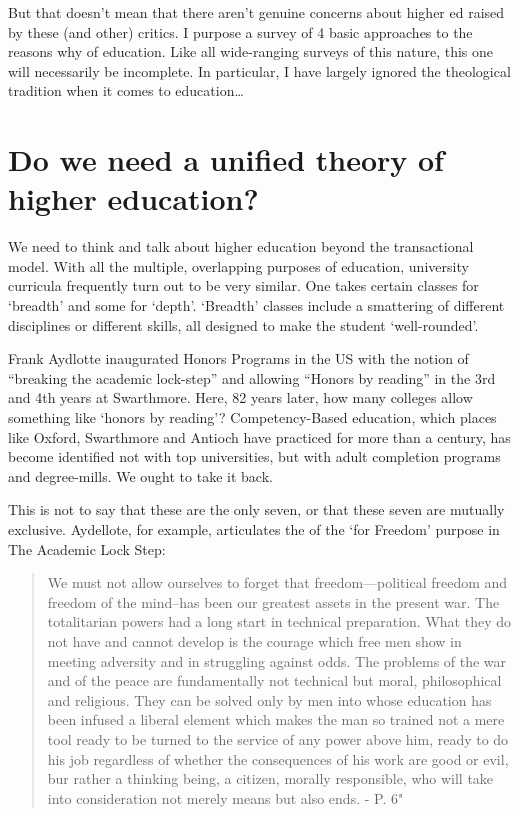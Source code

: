 But that doesn't mean that there aren't genuine concerns about higher ed raised by these (and other) critics. I purpose a survey of 4 basic approaches to the reasons why of education. Like all wide-ranging surveys of this nature, this one will necessarily be incomplete. In particular, I have largely ignored the theological tradition when it comes to education{\ldots}

\section{Do we need a unified theory of higher education?}
\label{doweneedaunifiedtheoryofhighereducation}

We need to think and talk about higher education beyond the transactional model. With all the multiple, overlapping purposes of education, university curricula frequently turn out to be very similar. One takes certain classes for `breadth' and some for `depth'. `Breadth' classes include a smattering of different disciplines or different skills, all designed to make the student `well-rounded'. 

Frank Aydlotte inaugurated Honors Programs in the US with the notion of ``breaking the academic lock-step'' and allowing ``Honors by reading'' in the 3rd and 4th years at Swarthmore. Here, 82 years later, how many colleges allow something like `honors by reading'? Competency-Based education, which places like Oxford, Swarthmore and Antioch have practiced for more than a century, has become identified not with top universities, but with adult completion programs and degree-mills. We ought to take it back.

This is not to say that these are the only seven, or that these seven are mutually exclusive. Aydellote, for example, articulates the of the `for Freedom' purpose in The Academic Lock Step:

\begin{quote}

We must not allow ourselves to forget that freedom---political freedom and freedom of the mind--has been our greatest assets in the present war. The totalitarian powers had a long start in technical preparation. What they do not have and cannot develop is the courage which free men show in meeting adversity and in struggling against odds. The problems of the war and of the peace are fundamentally not technical but moral, philosophical and religious. They can be solved only by men into whose education has been infused a liberal element which makes the man so trained not a mere tool ready to be turned to the service of any power above him, ready to do his job regardless of whether the consequences of his work are good or evil, bur rather a thinking being, a citizen, morally responsible, who will take into consideration not merely means but also ends. - P. 6"
\end{quote}

